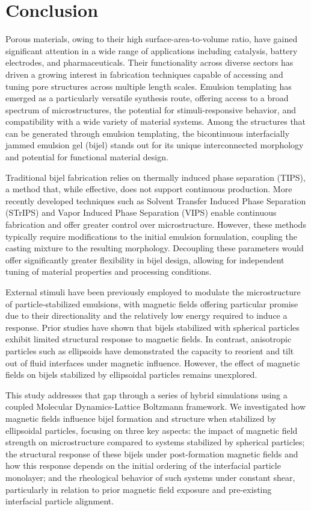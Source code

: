 \section{Conclusion}

Porous materials, owing to their high surface-area-to-volume ratio, have gained significant attention in a wide range of 
applications including catalysis, battery electrodes, and pharmaceuticals. Their functionality across diverse sectors has 
driven a growing interest in fabrication techniques capable of accessing and tuning pore structures across multiple length 
scales. Emulsion templating has emerged as a particularly versatile synthesis route, offering access to a broad spectrum of 
microstructures, the potential for stimuli-responsive behavior, and compatibility with a wide variety of material systems. 
Among the structures that can be generated through emulsion templating, the bicontinuous interfacially jammed emulsion gel 
(bijel) stands out for its unique interconnected morphology and potential for functional material design.

Traditional bijel fabrication relies on thermally induced phase separation (TIPS), a method that, while effective, does not 
support continuous production. More recently developed techniques such as Solvent Transfer Induced Phase Separation (STrIPS) 
and Vapor Induced Phase Separation (VIPS) enable continuous fabrication and offer greater control over microstructure. However, 
these methods typically require modifications to the initial emulsion formulation, coupling the casting mixture to the resulting 
morphology. Decoupling these parameters would offer significantly greater flexibility in bijel design, allowing for independent 
tuning of material properties and processing conditions.

External stimuli have been previously employed to modulate the microstructure of particle-stabilized emulsions, with magnetic 
fields offering particular promise due to their directionality and the relatively low energy required to induce a response. Prior 
studies have shown that bijels stabilized with spherical particles exhibit limited structural response to magnetic fields. In 
contrast, anisotropic particles such as ellipsoids have demonstrated the capacity to reorient and tilt out of fluid interfaces 
under magnetic influence. However, the effect of magnetic fields on bijels stabilized by ellipsoidal particles remains unexplored.

This study addresses that gap through a series of hybrid simulations using a coupled Molecular Dynamics-Lattice Boltzmann framework. 
We investigated how magnetic fields influence bijel formation and structure when stabilized by ellipsoidal particles, focusing on 
three key aspects: the impact of magnetic field strength on microstructure compared to systems stabilized by spherical particles; 
the structural response of these bijels under post-formation magnetic fields and how this response depends on the initial ordering 
of the interfacial particle monolayer; and the rheological behavior of such systems under constant shear, particularly in relation 
to prior magnetic field exposure and pre-existing interfacial particle alignment.

